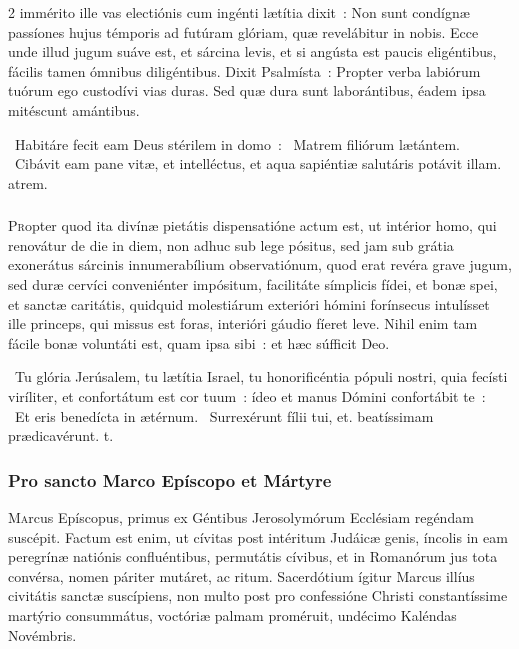 \documentclass[9pt,twoside]{extarticle}
\begin{document}
\begin{multicols}{2}
 immérito ille vas electiónis cum ingénti lætítia dixit~: Non sunt condígnæ passíones hujus témporis ad futúram glóriam, quæ revelábitur in nobis. Ecce unde illud jugum suáve est, et sárcina levis, et si angústa est paucis eligéntibus, fácilis tamen ómnibus diligéntibus. Dixit Psalmísta~: Propter verba labiórum tuórum ego custodívi vias duras. Sed quæ dura sunt laborántibus, éadem ipsa mitéscunt amántibus.

~Habitáre fecit eam Deus stérilem in domo~: \textred{*}~Matrem filiórum lætántem. ~Cibávit eam pane vitæ, et intelléctus, et aqua sapiéntiæ salutáris potávit illam. atrem.

\subsubsection*{\center \normalfont {}}
\lettrine{P}ropter quod ita divínæ pietátis dispensatióne actum est, ut intérior homo, qui renovátur de die in diem, non adhuc sub lege pósitus, sed jam sub grátia exonerátus sárcinis innumerabílium observatiónum, quod erat revéra grave jugum, sed duræ cervíci conveniénter impósitum, facilitáte símplicis fídei, et bonæ spei, et sanctæ caritátis, quidquid molestiárum exterióri hómini forínsecus intulísset ille princeps, qui missus est foras, interióri gáudio fíeret leve. Nihil enim tam fácile bonæ voluntáti est, quam ipsa sibi~: et hæc súfficit Deo.

~Tu glória Jerúsalem, tu lætítia Israel, tu honorificéntia pópuli nostri, quia fecísti viríliter, et confortátum est cor tuum~: ídeo et manus Dómini confortábit te~: \textred{*}~Et eris benedícta in ætérnum. ~Surrexérunt fílii tui, et. beatíssimam prædicavérunt. t.

\subsubsection*{\center \normalfont Pro sancto Marco Epíscopo et Mártyre\\
\small {}}
\lettrine{M}arcus Epíscopus, primus ex Géntibus Jerosolymórum Ecclésiam regéndam suscépit. Factum est enim, ut cívitas post intéritum Judáicæ genis, íncolis in eam peregrínæ natiónis confluéntibus, permutátis cívibus, et in Romanórum jus tota convérsa, nomen páriter mutáret, ac ritum. Sacerdótium ígitur Marcus illíus civitátis sanctæ suscípiens, non multo post pro confessióne Christi constantíssime martýrio consummátus, voctóriæ palmam proméruit, undécimo Kaléndas Novémbris.


\end{multicols}
\end{document}
